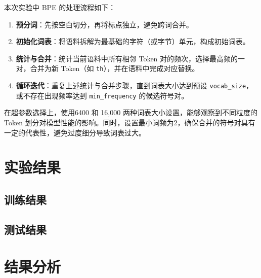 \documentclass[a4paper,12pt]{ctexart} %
\begin{document}
本次实验中 BPE 的处理流程如下：
\begin{enumerate}
    \item \textbf{预分词}：先按空白切分，再将标点独立，避免跨词合并。
    \item \textbf{初始化词表}：将语料拆解为最基础的字符（或字节）单元，构成初始词表。
    \item \textbf{统计与合并}：统计当前语料中所有相邻 Token 对的频次，选择最高频的一对，合并为新 Token（如 \texttt{th}），并在语料中完成对应替换。
    \item \textbf{循环迭代}：重复上述统计与合并步骤，直到词表大小达到预设 \texttt{vocab\_size}，或不存在出现频率达到 \texttt{min\_frequency} 的候选符号对。
\end{enumerate}
在超参数选择上，使用6400 和 16,000 两种词表大小设置，能够观察到不同粒度的 Token 划分对模型性能的影响。同时，设置最小词频为2，确保合并的符号对具有一定的代表性，避免过度细分导致词表过大。
\section{实验结果}


\subsection{训练结果}


\subsection{测试结果}


\section{结果分析}
\end{document}
